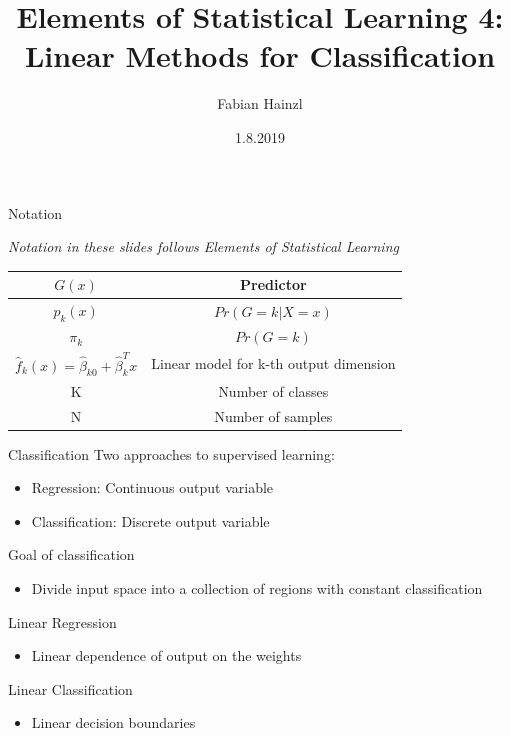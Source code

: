 \documentclass{beamer}
\title[Linear Classification]{Elements of Statistical Learning 4: \\
Linear Methods for Classification}
\author{Fabian Hainzl}
\institute{appliedAI}
\date{1.8.2019}
\begin{document}
\begin{frame}
  \titlepage
\end{frame}


\begin{frame}{Notation}

{\small \textit{Notation in these slides follows Elements of Statistical Learning}}
\vspace{0.5cm}
\begin{tabular}{|c|c|}
\hline
$G(x)$ & Predictor \\
\hline
$p_k(x)$ & $Pr(G=k|X=x)$ \\
\hline
$\pi_k$ & $Pr(G=k)$ \\
\hline
$\hat{f}_k(x) = \hat{\beta}_{k0}+\hat{\beta}_k^Tx$ & Linear model for k-th output dimension \\
\hline
K & Number of classes \\
\hline
N & Number of samples \\
\hline
\end{tabular}
\end{frame}

\begin{frame}{Classification}
Two approaches to supervised learning:
\begin{itemize}
\item Regression: Continuous output variable
\item Classification: Discrete output variable
\end{itemize}
\vspace{0.5cm}
Goal of classification
\begin{itemize}
\item Divide input space into a collection of regions with constant classification
\end{itemize}
\vspace{0.5cm}
Linear Regression
\pause
\begin{itemize}
\item Linear dependence of output on the weights
\end{itemize}
\vspace{0.5cm}
Linear Classification
\pause
\begin{itemize}
\item Linear decision boundaries
\end{itemize}

\end{frame}
\end{document}
